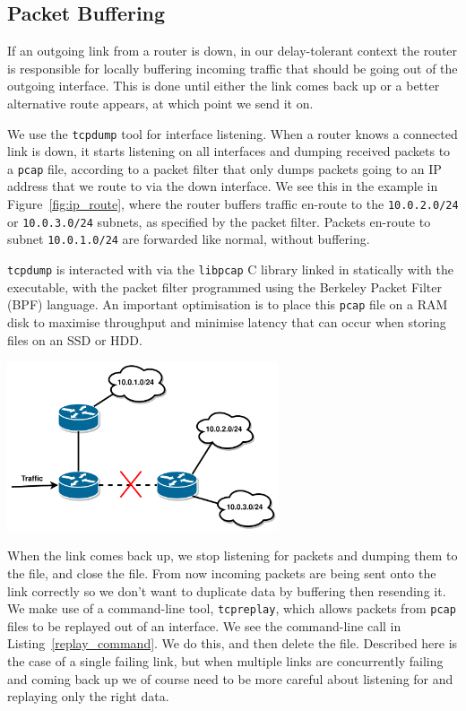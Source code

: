 \documentclass[withindex,glossary,openany]{cam-thesis}
\begin{document}
\subsection{Packet Buffering}

If an outgoing link from a router is down, in our delay-tolerant context the router is responsible for locally buffering incoming traffic that should be going out of the outgoing interface. This is done until either the link comes back up or a better alternative route appears, at which point we send it on.

We use the \texttt{tcpdump} tool for interface listening. When a router knows a connected link is down, it starts listening on all interfaces and dumping received packets to a \texttt{pcap} file, according to a packet filter that only dumps packets going to an IP address that we route to via the down interface. We see this in the example in Figure~\ref{fig:ip_route}, where the router buffers traffic en-route to the \texttt{10.0.2.0/24} or \texttt{10.0.3.0/24} subnets, as specified by the packet filter. Packets en-route to subnet \texttt{10.0.1.0/24} are forwarded like normal, without buffering.

 \texttt{tcpdump} is interacted with via the \texttt{libpcap} C library linked in statically with the executable, with the packet filter programmed using the Berkeley Packet Filter (BPF) language. An important optimisation is to place this \texttt{pcap} file on a RAM disk to maximise throughput and minimise latency that can occur when storing files on an SSD or HDD.

\begin{center}
\begin{minipage}{0.9\textwidth} \centering
	\includegraphics[width=0.6\textwidth]{ip_route}
	\label{fig:ip_route}
\end{minipage}
\end{center}

When the link comes back up, we stop listening for packets and dumping them to the file, and close the file. From now incoming packets are being sent onto the link correctly so we don't want to duplicate data by buffering then resending it. We make use of a command-line tool, \texttt{tcpreplay}, which allows packets from \texttt{pcap} files to be replayed out of  an interface. We see the command-line call in Listing~\ref{replay_command}. We do this, and then delete the file. Described here is the case of a single failing link, but when multiple links are concurrently failing and coming back up we of course need to be more careful about listening for and replaying only the right data.
\end{document}

